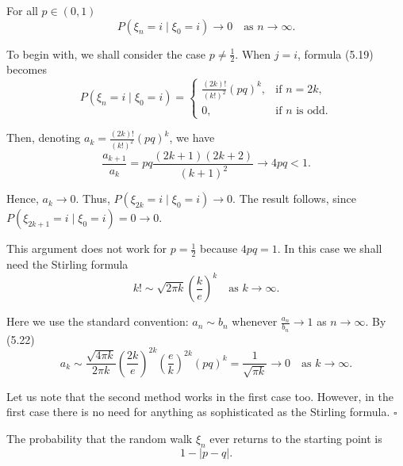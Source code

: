 \begin{Proposition}
\label{prp:simple-random-walk-return-prob}
For all $p \in (0,1)$
\[
P(\xi_n = i \mid \xi_0 = i) \to 0 \quad \text{as } n \to \infty. \tag{5.20}
\]
\end{Proposition}

\begin{Proof}
To begin with, we shall consider the case $p \neq \frac{1}{2}$. When $j = i$, formula (5.19) becomes
\[
P(\xi_n = i \mid \xi_0 = i) = \begin{cases} \frac{(2k)!}{(k!)^2} (pq)^k, & \text{if } n = 2k, \\ 0, & \text{if } n \text{ is odd.} \end{cases} \tag{5.21}
\]

Then, denoting $a_k = \frac{(2k)!}{(k!)^2} (pq)^k$, we have
\[
\frac{a_{k+1}}{a_k} = pq \frac{(2k+1)(2k+2)}{(k+1)^2} \to 4pq < 1.
\]

Hence, $a_k \to 0$. Thus, $P(\xi_{2k} = i \mid \xi_0 = i) \to 0$. The result follows, since $P(\xi_{2k+1} = i \mid \xi_0 = i) = 0 \to 0$.

This argument does not work for $p = \frac{1}{2}$ because $4pq = 1$. In this case we shall need the Stirling formula
\[
k! \sim \sqrt{2\pi k} \left(\frac{k}{e}\right)^k \quad \text{as } k \to \infty. \tag{5.22}
\]

Here we use the standard convention: $a_n \sim b_n$ whenever $\frac{a_n}{b_n} \to 1$ as $n \to \infty$. By (5.22)
\[
a_k \sim \frac{\sqrt{4\pi k}}{2\pi k} \left(\frac{2k}{e}\right)^{2k} \left(\frac{e}{k}\right)^{2k} (pq)^k = \frac{1}{\sqrt{\pi k}} \to 0 \quad \text{as } k \to \infty.
\]

Let us note that the second method works in the first case too. However, in the first case there is no need for anything as sophisticated as the Stirling formula. $\square$
\end{Proof}

\begin{Proposition}
\label{prp:return-probability}
The probability that the random walk $\xi_n$ ever returns to the starting point is
\[
1 - |p - q|.
\]
\end{Proposition}

